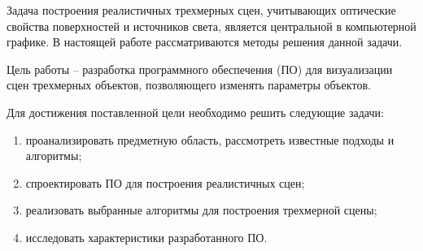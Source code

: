 
Задача построения реалистичных трехмерных сцен, учитывающих оптические свойства поверхностей и источников света, является центральной в компьютерной графике. В настоящей работе рассматриваются методы решения данной задачи.

Цель работы -- разработка программного обеспечения (ПО) для визуализации сцен трехмерных объектов, позволяющего изменять параметры объектов.

Для достижения поставленной цели необходимо решить следующие задачи:
\begin{enumerate}
	\item проанализировать предметную область, рассмотреть известные подходы и алгоритмы;
	\item спроектировать ПО для построения реалистичных сцен;
	\item реализовать выбранные алгоритмы для построения трехмерной сцены;
	\item исследовать характеристики разработанного ПО.
\end{enumerate}

\clearpage

